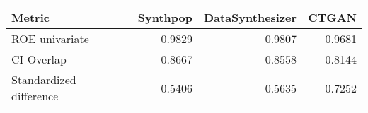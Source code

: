\begin{tabular}{lrrr}
  \toprule
Metric & Synthpop & DataSynthesizer & CTGAN \\ 
  \midrule
\medskip ROE univariate & 0.9829 & 0.9807 & 0.9681 \\ 
  CI Overlap & 0.8667 & 0.8558 & 0.8144 \\ 
  Standardized difference & 0.5406 & 0.5635 & 0.7252 \\ 
   \bottomrule
\end{tabular}
